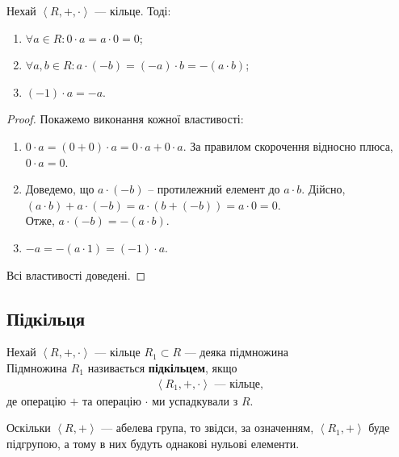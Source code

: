 \documentclass{math_library}
\begin{document}
\begin{proposition}[Властивості]
Нехай $\left<R,+,\cdot \right>$ --- кільце. Тоді:
\begin{enumerate}[nosep, wide=0pt, label={\arabic*)}]
\item $\forall a \in R: 0 \cdot a = a \cdot 0 = 0$;
\item $\forall a,b \in R: a \cdot (-b) = (-a) \cdot b = -(a \cdot b)$;
\item $(-1) \cdot a = -a$.
\end{enumerate}
\end{proposition}

\begin{proof}
Покажемо виконання кожної властивості:
\begin{enumerate}[wide=0pt, label={\arabic*)}]
\item $0 \cdot a = (0 + 0) \cdot a = 0 \cdot a + 0 \cdot a$. За правилом скорочення відносно плюса, $0 \cdot a = 0$.

\item Доведемо, що $a \cdot (-b)$ -- протилежний елемент до $a \cdot b$. Дійсно,\\
$(a \cdot b) + a \cdot (-b) = a \cdot (b + (-b)) = a \cdot 0 = 0$.\\
Отже, $a \cdot (-b) = -(a \cdot b)$.

\item $-a = -(a \cdot 1) = (-1) \cdot a$.
\end{enumerate}
Всі властивості доведені.
\end{proof}

\subsection{Підкільця}
\begin{definition}
Нехай $\left<R,+, \cdot \right>$ --- кільце $R_1 \subset R$ --- деяка підмножина\\
Підмножина $R_1$ називається \textbf{підкільцем}, якщо 
\begin{align*}
\left<R_1,+,\cdot \right> \text{ --- кільце},
\end{align*}
де операцію $+$ та операцію $\cdot$ ми успадкували з $R$.
\end{definition}

\begin{remark}
Оскільки $\left< R,+\right>$ --- абелева група, то звідси, за означенням, $\left< R_1,+\right>$ буде підгрупою, а тому в них будуть однакові нульові елементи.
\end{remark}
\end{document}
